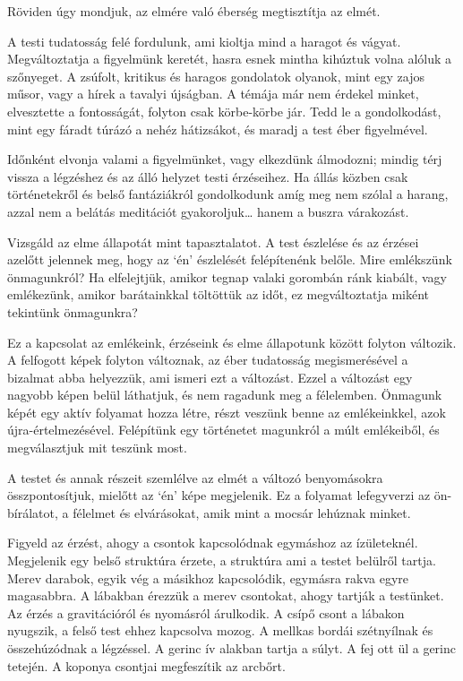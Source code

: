 Röviden úgy mondjuk, az elmére való éberség megtisztítja az elmét.

A testi tudatosság felé fordulunk, ami kioltja mind a haragot és vágyat.
Megváltoztatja a figyelmünk keretét, hasra esnek mintha kihúztuk volna
alóluk a szőnyeget. A zsúfolt, kritikus és haragos gondolatok olyanok,
mint egy zajos műsor, vagy a hírek a tavalyi újságban. A témája már nem
érdekel minket, elvesztette a fontosságát, folyton csak körbe-körbe jár.
Tedd le a gondolkodást, mint egy fáradt túrázó a nehéz hátizsákot, és
maradj a test éber figyelmével.

Időnként elvonja valami a figyelmünket, vagy elkezdünk álmodozni; mindig
térj vissza a légzéshez és az álló helyzet testi érzéseihez. Ha állás
közben csak történetekről és belső fantáziákról gondolkodunk amíg meg
nem szólal a harang, azzal nem a belátás meditációt gyakoroljuk\ldots{}
hanem a buszra várakozást.

\clearpage


Vizsgáld az elme állapotát mint tapasztalatot. A test észlelése és az
érzései azelőtt jelennek meg, hogy az `én' észlelését felépítenénk
belőle. Mire emlékszünk önmagunkról? Ha elfelejtjük, amikor tegnap
valaki gorombán ránk kiabált, vagy emlékezünk, amikor barátainkkal
töltöttük az időt, ez megváltoztatja miként tekintünk önmagunkra?

Ez a kapcsolat az emlékeink, érzéseink és elme állapotunk között folyton
változik. A felfogott képek folyton változnak, az éber tudatosság
megismerésével a bizalmat abba helyezzük, ami ismeri ezt a változást.
Ezzel a változást egy nagyobb képen belül láthatjuk, és nem ragadunk meg
a félelemben. Önmagunk képét egy aktív folyamat hozza létre, részt
veszünk benne az emlékeinkkel, azok újra-értelmezésével. Felépítünk egy
történetet magunkról a múlt emlékeiből, és megválasztjuk mit teszünk
most.


A testet és annak részeit szemlélve az elmét a változó benyomásokra
összpontosítjuk, mielőtt az `én' képe megjelenik. Ez a folyamat
lefegyverzi az ön-bírálatot, a félelmet és elvárásokat, amik mint a
mocsár lehúznak minket.

\enlargethispage*{\baselineskip}

Figyeld az érzést, ahogy a csontok kapcsolódnak egymáshoz az
ízületeknél. Megjelenik egy belső struktúra érzete, a struktúra ami a
testet belülről tartja. Merev darabok, egyik vég a másikhoz kapcsolódik,
egymásra rakva egyre magasabbra. A lábakban érezzük a merev csontokat,
ahogy tartják a testünket. Az érzés a gravitációról és nyomásról
árulkodik. A csípő csont a lábakon nyugszik, a felső test ehhez
kapcsolva mozog. A mellkas bordái szétnyílnak és összehúzódnak a
légzéssel. A gerinc ív alakban tartja a súlyt. A fej ott ül a gerinc
tetején. A koponya csontjai megfeszítik az arcbőrt.

